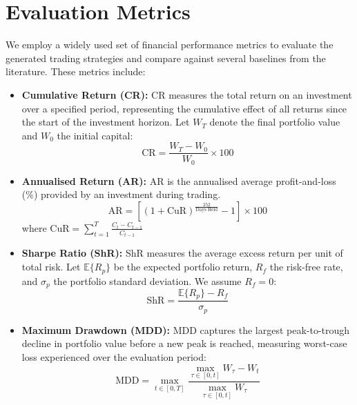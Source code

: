 \documentclass[12pt, a4paper]{report}
\begin{document}
\section{Evaluation Metrics}
We employ a widely used set of financial performance metrics to evaluate the generated trading
strategies and compare against several baselines from the literature.
These metrics include:

\begin{itemize}
  \item \textbf{Cumulative Return (CR):} CR measures the total return on an investment over a
  specified period, representing the cumulative effect of all returns since the start of the
  investment horizon. Let $W_T$ denote the final portfolio value and $W_0$ the initial capital:
  \begin{equation}
    \text{CR} = \frac{W_T - W_0}{W_0} \times 100
  \end{equation}

  \item \textbf{Annualised Return (AR):} AR is the annualised average profit-and-loss (\%)
  provided by an investment during trading.  
  \begin{equation}
    \text{AR} = \left[\left(1 + \text{CuR}\right)^{\frac{252}{\text{Days Held}}} - 1\right] \times 100
  \end{equation} where $\text{CuR} = \sum_{t=1}^{T}
  \frac{C_t - C_{t-1}}{C_{t-1}}$

  \item \textbf{Sharpe Ratio (ShR):} ShR measures the average excess return per unit of total
  risk. Let $\mathbb{E}\{R_p\}$ be the expected portfolio return, $R_f$ the risk-free rate, and
  $\sigma_p$ the portfolio standard deviation. We assume $R_f = 0$:
  \begin{equation}
    \text{ShR} = \frac{\mathbb{E}\{R_p\} - R_f}{\sigma_p}
  \end{equation}

  \item \textbf{Maximum Drawdown (MDD):} MDD captures the largest peak-to-trough decline in
  portfolio value before a new peak is reached, measuring worst-case loss experienced over the
  evaluation period:
  \begin{equation}
    \text{MDD} = \max_{t \in [0,T]} \frac{\displaystyle\max_{\tau \in [0,t]} W_\tau - W_t}{\displaystyle\max_{\tau \in [0,t]} W_\tau}
  \end{equation}
\end{itemize}
\end{document}

